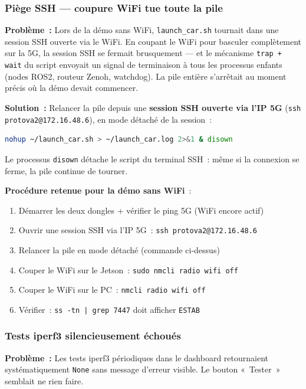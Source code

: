 \documentclass[a4paper,11pt]{article}
\begin{document}
\subsubsection{Piège SSH — coupure WiFi tue toute la pile}

\textbf{Problème~:} Lors de la démo sans WiFi, \texttt{launch\_car.sh} tournait
dans une session SSH ouverte via le WiFi. En coupant le WiFi pour basculer
complètement sur la 5G, la session SSH se fermait brusquement — et le
mécanisme \texttt{trap + wait} du script envoyait un signal de terminaison à tous
les processus enfants (nodes ROS2, routeur Zenoh, watchdog). La pile entière
s'arrêtait au moment précis où la démo devait commencer.

\textbf{Solution~:} Relancer la pile depuis une \textbf{session SSH ouverte via
l'IP 5G} (\texttt{ssh protova2@172.16.48.6}), en mode détaché de la session~:
\begin{lstlisting}[language=bash]
nohup ~/launch_car.sh > ~/launch_car.log 2>&1 & disown
\end{lstlisting}
Le processus \texttt{disown} détache le script du terminal SSH~: même si la
connexion se ferme, la pile continue de tourner.

\textbf{Procédure retenue pour la démo sans WiFi}~:
\begin{enumerate}[noitemsep]
  \item Démarrer les deux dongles + vérifier le ping 5G (WiFi encore actif)
  \item Ouvrir une session SSH via l'IP 5G~: \texttt{ssh protova2@172.16.48.6}
  \item Relancer la pile en mode détaché (commande ci-dessus)
  \item Couper le WiFi sur le Jetson~: \texttt{sudo nmcli radio wifi off}
  \item Couper le WiFi sur le PC~: \texttt{nmcli radio wifi off}
  \item Vérifier~: \texttt{ss -tn | grep 7447} doit afficher \texttt{ESTAB}
\end{enumerate}

\subsubsection{Tests iperf3 silencieusement échoués}

\textbf{Problème~:} Les tests iperf3 périodiques dans le dashboard retournaient
systématiquement \texttt{None} sans message d'erreur visible. Le bouton
«~Tester~» semblait ne rien faire.
\end{document}
